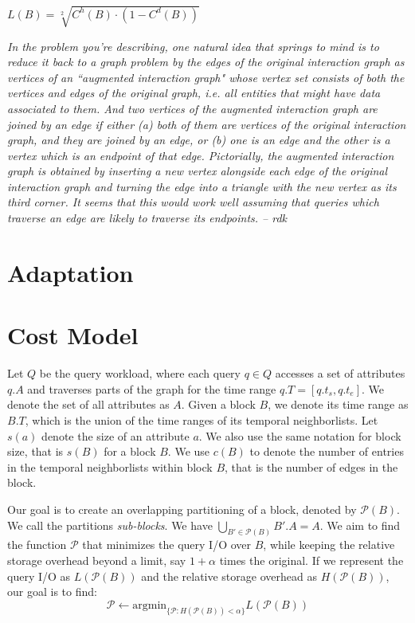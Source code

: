\documentclass{sig-alternate}
\begin{document}
$L(B) = \sqrt[2]{C^h(B) \cdot ( 1 - C^d(B))}$


\emph{In the problem you're describing, one natural idea that springs to mind is
  to reduce it back to a graph problem by the edges of the original interaction
  graph as vertices of an ``augmented interaction graph" whose vertex set
  consists of both the vertices and edges of the original graph, i.e. all
  entities that might have data associated to them. And two vertices of the
  augmented interaction graph are joined by an edge if either (a) both of them
  are vertices of the original interaction graph, and they are joined by an
  edge, or (b) one is an edge and the other is a vertex which is an endpoint of
  that edge. Pictorially, the augmented interaction graph is obtained by
  inserting a new vertex alongside each edge of the original interaction graph
  and turning the edge into a triangle with the new vertex as its third
  corner. It seems that this would work well assuming that queries which
  traverse an edge are likely to traverse its endpoints. -- rdk}

\section{Adaptation}

\section{Cost Model}

Let $Q$ be the query workload, where each query $q\in Q$ accesses a set of
attributes $q.A$ and traverses parts of the graph for the time range
$q.T=[q.t_s,q.t_e]$. We denote the set of all attributes as $A$. Given a block
$B$, we denote its time range as $B.T$, which is the union of the time ranges
of its temporal neighborlists. Let $s(a)$ denote the size of an attribute $a$.
We also use the same notation for block size, that is $s(B)$ for a block $B$. 
We use $c(B)$ to denote the number of entries in the temporal neighborlists
within block $B$, that is the number of edges in the block. 

Our goal is to create an overlapping partitioning of a block, denoted by
$\mathcal{P}(B)$. We call the partitions \emph{sub-blocks}. We have
$\bigcup_{B'\in \mathcal{P}(B)} B'.A = A$. We aim to find the function
$\mathcal{P}$ that minimizes the query I/O over $B$, while keeping the
relative storage overhead beyond a limit, say $1+\alpha$ times the original.
If we represent the query I/O as $L(\mathcal{P}(B))$ and the relative storage
overhead as $H(\mathcal{P}(B))$, our goal is to find:
\begin{equation}
\mathcal{P} \leftarrow \mbox{argmin}_{\{\mathcal{P}: H(\mathcal{P}(B)) < \alpha\}} L(\mathcal{P}(B))
\end{equation}
\end{document}
